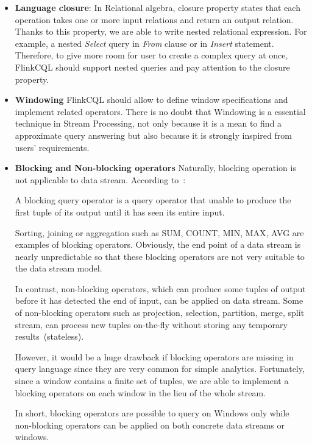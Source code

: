 \begin{itemize}
	\item \textbf{Language closure}: In Relational algebra, closure property states that each operation takes one or more input relations and return an output relation. Thanks to this property, we are able to write nested relational expression. For example, a nested \textit{Select} query in \textit{From} clause or in \textit{Insert} statement. 
	Therefore, to give more room for user to create a complex query at once, FlinkCQL should support nested queries and pay attention to the closure property. 
	
	\item \textbf{Windowing} FlinkCQL should allow to define window specifications and  implement related operators. There is no doubt that Windowing is a essential technique in Stream Processing, not only because it is a mean to find a approximate query answering but also because it is strongly inspired from users' requirements. 
	
	\item \textbf{Blocking and Non-blocking operators} Naturally, blocking operation is not applicable to data stream.  According to~\citep{Babcock:2002}:
	\begin{defi}
		A blocking query operator is a query operator that unable to produce the first tuple of its output until it has seen its entire input.
	\end{defi} 

Sorting, joining or aggregation such as SUM, COUNT, MIN, MAX, AVG are examples of blocking operators. Obviously, the end point of a data stream is nearly unpredictable so that these blocking operators are not very suitable to the data stream model. 

In contrast, non-blocking operators, which can produce some tuples of output before it has detected the end of input, can be applied on data stream. Some of non-blocking operators such as projection, selection, partition, merge, split stream, can process new tuples on-the-fly without storing any temporary results~(stateless).

However, it would be a huge drawback if blocking operators are missing in query language since they are very common for simple analytics. Fortunately, since a window contains a finite set of tuples, we are able to implement a blocking operators on each window in the lieu of the whole stream. 

In short, blocking operators are possible to query on Windows only  while non-blocking operators can be applied on both concrete data streams or windows. 
	
\end{itemize}


